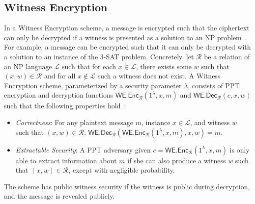 \subsection{Witness Encryption}
    In a Witness Encryption scheme, a message is encrypted such that the ciphertext can only be decrypted if a witness is presented as a solution to an NP problem~\cite{witness_encryption}.
    For example, a message can be encrypted such that it can only be decrypted with a solution to an instance of the 3-SAT problem.
    Concretely, let $\mathcal{R}$ be a relation of an NP language $\mathcal{L}$ such that for each $x \in \mathcal{L}$, there exists some $w$ such that $(x, w) \in \mathcal{R}$ and for all $x \notin \mathcal{L}$ such a witness does not exist.
    A Witness Encryption scheme, parameterized by a security parameter $\lambda$, consists of PPT encryption and decryption functions $\textsf{WE.Enc}_\mathcal{R}(1^{\lambda}, x, m)$ and $\textsf{WE.Dec}_\mathcal{R}(c, x, w)$ such that the following properties hold~\cite{timelock_from_crc}:
    \begin{itemize}
        \item \emph{Correctness}: For any plaintext message $m$, instance $x \in \mathcal{L}$, and witness $w$ such that $(x, w) \in \mathcal{R}$, $\textsf{WE.Dec}_\mathcal{R}(\textsf{WE.Enc}_\mathcal{R}(1^{\lambda}, x, m), x, w) = m$.
        \item \emph{Extractable Security}: A PPT adversary given $c = \textsf{WE.Enc}_\mathcal{R}(1^{\lambda}, x, m)$ is only able to extract information about $m$ if she can also produce a witness $w$ such that $(x, w) \in \mathcal{R}$, except with negligible probability.
    \end{itemize}
    The scheme has public witness security if the witness is public during decryption, and the message is revealed publicly.
